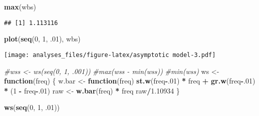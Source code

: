 \documentclass[]{article}
\newenvironment{Shaded}{\begin{snugshade}}{\end{snugshade}}
\newcommand{\KeywordTok}[1]{\textcolor[rgb]{0.13,0.29,0.53}{\textbf{#1}}}
\newcommand{\DecValTok}[1]{\textcolor[rgb]{0.00,0.00,0.81}{#1}}
\newcommand{\FloatTok}[1]{\textcolor[rgb]{0.00,0.00,0.81}{#1}}
\newcommand{\StringTok}[1]{\textcolor[rgb]{0.31,0.60,0.02}{#1}}
\newcommand{\CommentTok}[1]{\textcolor[rgb]{0.56,0.35,0.01}{\textit{#1}}}
\newcommand{\ControlFlowTok}[1]{\textcolor[rgb]{0.13,0.29,0.53}{\textbf{#1}}}
\newcommand{\OperatorTok}[1]{\textcolor[rgb]{0.81,0.36,0.00}{\textbf{#1}}}
\newcommand{\NormalTok}[1]{#1}
\begin{document}
\begin{Shaded}
\begin{Highlighting}[]
\KeywordTok{max}\NormalTok{(wbs)}
\end{Highlighting}
\end{Shaded}

\begin{verbatim}
## [1] 1.113116
\end{verbatim}

\begin{Shaded}
\begin{Highlighting}[]
\KeywordTok{plot}\NormalTok{(}\KeywordTok{seq}\NormalTok{(}\DecValTok{0}\NormalTok{, }\DecValTok{1}\NormalTok{, .}\DecValTok{01}\NormalTok{), wbs)}
\end{Highlighting}
\end{Shaded}

\texttt{[image: analyses\_files/figure-latex/asymptotic model-3.pdf]}

\begin{Shaded}
\begin{Highlighting}[]
\CommentTok{#wss <- ws(seq(0, 1, .001))}
\CommentTok{#max(wss - min(wss))}
\CommentTok{#min(wss)}
\NormalTok{ws <-}\StringTok{ }\ControlFlowTok{function}\NormalTok{(freq) \{}
\NormalTok{  w.bar <-}\StringTok{ }\ControlFlowTok{function}\NormalTok{(freq) }\KeywordTok{st.w}\NormalTok{(freq}\OperatorTok{-}\NormalTok{.}\DecValTok{01}\NormalTok{) }\OperatorTok{*}\StringTok{ }\NormalTok{freq }\OperatorTok{+}\StringTok{ }\KeywordTok{gr.w}\NormalTok{(freq}\OperatorTok{-}\NormalTok{.}\DecValTok{01}\NormalTok{) }\OperatorTok{*}\StringTok{ }\NormalTok{(}\DecValTok{1} \OperatorTok{-}\StringTok{ }\NormalTok{freq}\OperatorTok{-}\NormalTok{.}\DecValTok{01}\NormalTok{)}
\NormalTok{  raw <-}\StringTok{ }\KeywordTok{w.bar}\NormalTok{(freq) }\OperatorTok{*}\StringTok{ }\NormalTok{freq}
\NormalTok{  raw}\OperatorTok{/}\FloatTok{1.10934}
\NormalTok{  \}}

\KeywordTok{ws}\NormalTok{(}\KeywordTok{seq}\NormalTok{(}\DecValTok{0}\NormalTok{, }\DecValTok{1}\NormalTok{, .}\DecValTok{01}\NormalTok{))}
\end{Highlighting}
\end{Shaded}
\end{document}

